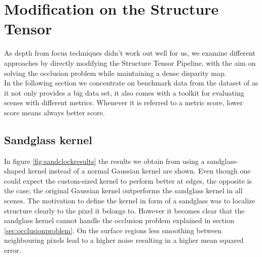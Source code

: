 \documentclass  [
  paper    = a4,
  BCOR     = 10mm,
  twoside,
  fontsize = 12pt,
  fleqn,
  toc      = bibnumbered,
  toc      = listofnumbered,
  numbers  = noendperiod,
  headings = normal,
  listof   = leveldown,
  version  = 3.03
]                                       {scrreprt}
\begin{document}
	 

\section{Modification on the Structure Tensor}
As depth from focus techniques didn't work out well for us, we examine different approaches by directly modifying the Structure Tensor Pipeline, with the aim on solving the occlusion problem while maintaining a dense disparity map.\\
In the following section we concentrate on benchmark data from the dataset of \cite{honauer2016benchmark} as it not only provides a big data set, it also comes with a toolkit for evaluating scenes with different metrics. Whenever it is referred to a metric score, lower score means always better score.
\subsection{Sandglass kernel}
In figure \ref{fig:sandclockresults} the results we obtain from using a sandglass-shaped kernel instead of a normal Gaussian kernel are shown. Even though one could expect the custom-sized kernel to perform better at edges, the opposite is the case; the original Gaussian kernel outperforms the sandglass kernel in all scenes. The motivation to define the kernel in form of a sandglass was to localize structure clearly to the pixel it belongs to. However it becomes clear that the sandglass kernel cannot handle the occlusion problem explained in section \ref{sec:occlusionproblem}. On the surface regions less smoothing between neighbouring pixels lead to a higher noise resulting in a higher mean squared error. 
\end{document}
